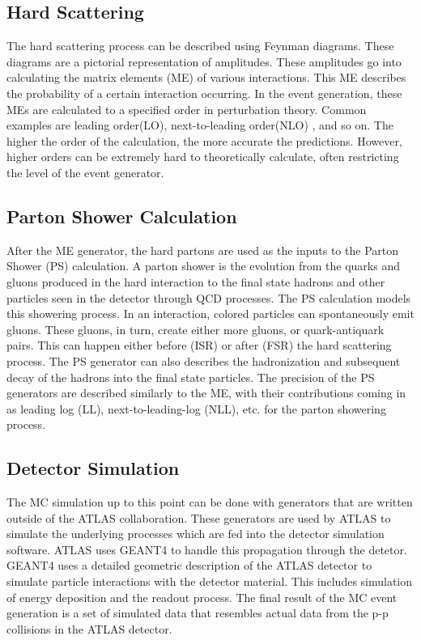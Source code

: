 \subsection{Hard Scattering}
\indent The hard scattering process can be described using Feynman diagrams. These diagrams are a pictorial representation of amplitudes. These amplitudes go into calculating the matrix elements (ME) of various interactions. This ME describes the probability of a certain interaction occurring. In the event generation, these MEs are calculated to a specified order in perturbation theory. Common examples are leading order(LO), next-to-leading order(NLO) , and so on. The higher the order of the calculation, the more accurate the predictions. However, higher orders can be extremely hard to theoretically calculate, often restricting the level of the event generator. \newline
\subsection{Parton Shower Calculation}
\indent  After the ME generator, the hard partons are used as the inputs to the Parton Shower (PS) calculation. A parton shower is the evolution from the quarks and gluons produced in the hard interaction to the final state hadrons and other particles seen in the detector through QCD processes. The PS calculation models this showering process. \newline
In an interaction, colored particles can spontaneously emit gluons. These gluons, in turn, create either more gluons, or quark-antiquark pairs. This can happen either before (ISR) or after (FSR) the hard scattering process. The PS generator can also describes the hadronization and subsequent decay of the hadrons into the final state particles. \newline
The precision of the PS generators are described similarly to the ME, with their contributions coming in as leading log (LL), next-to-leading-log (NLL), etc. for the parton showering process. \newline
\subsection{Detector Simulation}
\indent The MC simulation up to this point can be done with generators that are written outside of the ATLAS collaboration. These generators are used by ATLAS to simulate the underlying processes which are fed into the detector simulation software. ATLAS uses GEANT4 to handle this propagation\cite{geant4} through the detetor. GEANT4 uses a detailed geometric description of the ATLAS detector to simulate particle interactions with the detector material. This includes simulation of energy deposition and the readout process. \newline
\indent The final result of the MC event generation is a set of simulated data that resembles actual data from the p-p collisions in the ATLAS detector.
